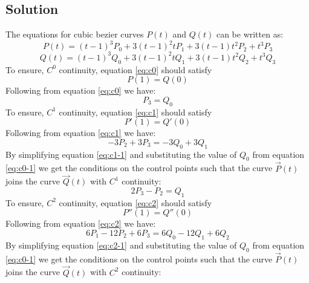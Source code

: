 \documentclass[a4paper, 11pt]{article}
\begin{document}
\begin{enumerate}
\begin{enumerate}[label=\alph*.]
    \subsection*{Solution}
    The equations for cubic bezier curves \(P(t)\) and \(Q(t)\) can be written as:
    \begin{equation}
    \label{eq:p(t)}
        P(t) = (t-1)^3 P_0 + 3(t-1)^2 t P_1 + 3(t-1) t^2 P_2 + t^3 P_3 
    \end{equation}
    \begin{equation}
    \label{eq:q(t)}
        Q(t) = (t-1)^3 Q_0 + 3(t-1)^2 t Q_1 + 3(t-1) t^2 Q_2 + t^3 Q_3 
    \end{equation}
    To ensure, \(C^0\) continuity, equation \ref{eq:c0} should satisfy
    \begin{equation}
        \label{eq:c0}
        P(1) = Q(0)
    \end{equation}
    Following from equation \ref{eq:c0} we have:
    \begin{equation}
        \label{eq:c0-1}
        P_3 = Q_0
    \end{equation}
    To ensure, \(C^1\) continuity, equation \ref{eq:c1} should satisfy
    \begin{equation}
        \label{eq:c1}
        P'(1) = Q'(0)
    \end{equation}
    Following from equation \ref{eq:c1} we have:
    \begin{equation}
        \label{eq:c1-1}
        -3P_2 + 3P_3 = -3Q_0 + 3Q_1
    \end{equation} 
    By simplifying equation \ref{eq:c1-1} and substituting the value of \(Q_0\) from equation \ref{eq:c0-1} we get the conditions on the control points such that the curve \(\vec P(t) \) joins the curve \(\vec Q(t)\) with \(C^1\) continuity:
    \begin{equation}
        \label{eq:c1-2}
        \boxed{2P_3 - P_2 = Q_1}
    \end{equation}
    To ensure, \(C^2\) continuity, equation \ref{eq:c2} should satisfy
    \begin{equation}
        \label{eq:c2}
        P''(1) = Q''(0)
    \end{equation}
    Following from equation \ref{eq:c2} we have:
    \begin{equation}
        \label{eq:c2-1}
       6P_1 - 12P_2 + 6P_3 = 6Q_0 - 12Q_1 + 6Q_2
    \end{equation} 
    By simplifying equation \ref{eq:c2-1} and substituting the value of \(Q_0\) from equation \ref{eq:c0-1} we get the conditions on the control points such that the curve \(\vec P(t) \) joins the curve \(\vec Q(t)\) with \(C^2\) continuity:

\end{enumerate}
\end{enumerate}
\end{document}
